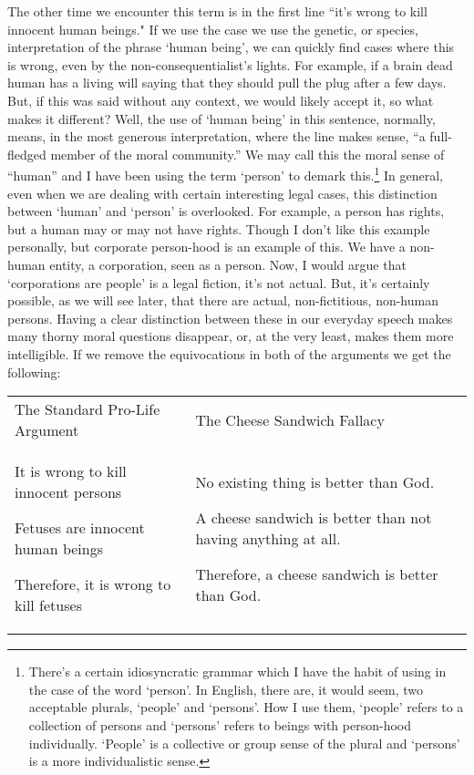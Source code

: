 The other time we encounter this term is in the first line ``it's wrong to kill innocent human beings." If we use the case we use the genetic, or species, interpretation of the phrase `human being', we can quickly find cases where this is wrong, even by the non-consequentialist's lights. For example, if a brain dead human has a living will saying that they should pull the plug after a few days. But, if this was said without any context, we would likely accept it, so what makes it different? Well, the use of `human being' in this sentence, normally, means, in the most generous interpretation, where the line makes sense,  “a full-fledged member of the moral community.” We may call this the moral sense of “human” and I have been using the term ‘person’ to demark this.\footnote{There's a certain idiosyncratic grammar which I have the habit of using in the case of the word `person'. In English, there are, it would seem, two acceptable plurals, `people' and `persons'. How I use them, `people' refers to a collection of persons and `persons' refers to beings with person-hood individually. `People' is a collective or group sense of the plural and `persons' is a more individualistic sense.} In general, even when we are dealing with certain interesting legal cases, this distinction between `human' and `person' is overlooked. For example, a person has rights, but a human may or may not have rights. Though I don't like this example personally, but corporate person-hood is an example of this. We have a non-human entity, a corporation, seen as a person. Now, I would argue that `corporations are people' is a legal fiction, it's not actual. But, it's certainly possible, as we will see later, that there are actual, non-fictitious, non-human persons. Having a clear distinction between these in our everyday speech makes many thorny moral questions disappear, or, at the very least, makes them more intelligible. If we remove the equivocations in both of the arguments we get the following:

\begin{tabular}{p{2in}|p{2in}}
The Standard Pro-Life Argument&The Cheese Sandwich Fallacy\\
\begin{earg}
    \item[] It is wrong to kill innocent persons
    \item[] Fetuses are innocent human beings
    \item[] Therefore, it is wrong to kill fetuses
\end{earg}&
\begin{earg}
    \item[] No existing thing is better than God.
    \item[] A cheese sandwich is better than not having anything at all.
    \item[] Therefore, a cheese sandwich is better than God. 
\end{earg}
\end{tabular}

